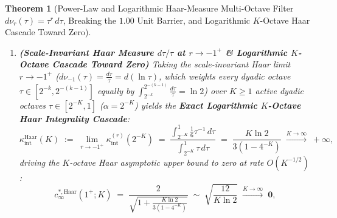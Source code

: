 \documentclass[11pt,reqno]{amsart}
\newtheorem{theorem}{Theorem}[section]
\theoremstyle{definition}
\theoremstyle{remark}
\begin{document}
\begin{theorem}[Power-Law and Logarithmic Haar-Measure Multi-Octave Filter $d\nu_r(\tau) = \tau^r\,d\tau$, Breaking the $1.00$ Unit Barrier, and Logarithmic $K$-Octave Haar Cascade Toward Zero]
\begin{enumerate}
\begin{equation}
\begin{aligned}
      r = -\tfrac{3}{5}: &\;\; \kappa_{\mathrm{int}}^{(-3/5)}(0^+) = 1,\;\; \mu_{\mathrm{scale}}^{(-3/5)} = 4,\;\; c_\infty^{*,(-3/5)}(1^+) = \sqrt{2} \approx 1.414214, \\
      r = -\tfrac{3}{4}: &\;\; \kappa_{\mathrm{int}}^{(-3/4)}(0^+) = \frac{3}{2},\;\; \mu_{\mathrm{scale}}^{(-3/4)} = 5,\;\; c_\infty^{*,(-3/4)}(1^+) = \frac{2\sqrt{10}}{5} \approx 1.264911, \\
      r = -\tfrac{15}{17}\ (\text{Unit}): &\;\; \kappa_{\mathrm{int}}^{(-15/17)}(0^+) = 3,\;\; \mu_{\mathrm{scale}}^{(-15/17)} = 8,\;\; c_\infty^{*,(-15/17)}(1^+) = \mathbf{1.000000}, \\
      r = -\tfrac{9}{10}\ (\text{Sub-1}): &\;\; \kappa_{\mathrm{int}}^{(-9/10)}(0^+) = \frac{7}{2},\;\; \mu_{\mathrm{scale}}^{(-9/10)} = 9,\;\; c_\infty^{*,(-9/10)}(1^+) = \frac{2\sqrt{2}}{3} \approx \mathbf{0.942809}.
    \end{aligned}
  \end{equation}
  \item[\textup{(b)}] \textbf{(Scale-Invariant Haar Measure $d\tau/\tau$ at $r \to -1^+$ \& Logarithmic $K$-Octave Cascade Toward Zero)} Taking the scale-invariant Haar limit $r \to -1^+$ ($d\nu_{-1}(\tau) = \frac{d\tau}{\tau} = d(\ln \tau)$, which weights every dyadic octave $\tau \in [2^{-k}, 2^{-(k-1)}]$ equally by $\int_{2^{-k}}^{2^{-(k-1)}} \frac{d\tau}{\tau} = \ln 2$) over $K \ge 1$ active dyadic octaves $\tau \in [2^{-K}, 1]$ ($\alpha = 2^{-K}$) yields the \textbf{Exact Logarithmic $K$-Octave Haar Integrality Cascade}:
  \begin{equation}\label{eq:kappa_int_haar}
    \kappa_{\mathrm{int}}^{\mathrm{Haar}}(K) \;:=\; \lim_{r \to -1^+} \kappa_{\mathrm{int}}^{(r)}(2^{-K}) \;=\; \frac{\int_{2^{-K}}^1 \frac{1}{6}\tau^{-1}\,d\tau}{\int_{2^{-K}}^1 \tau\,d\tau} \;=\; \frac{K \ln 2}{3(1 - 4^{-K})} \;\xrightarrow{K \to \infty}\; +\infty,
  \end{equation}
  driving the $K$-octave Haar asymptotic upper bound to zero at rate $O(K^{-1/2})$:
  \begin{equation}\label{eq:c_infty_haar_cascade}
    c_\infty^{*,\mathrm{Haar}}(1^+; K) \;=\; \frac{2}{\sqrt{1 + \frac{K \ln 2}{3(1 - 4^{-K})}}} \;\sim\; \sqrt{\frac{12}{K \ln 2}} \;\xrightarrow{K \to \infty}\; \mathbf{0},
  \end{equation}

\end{enumerate}
\end{theorem}
\end{document}

